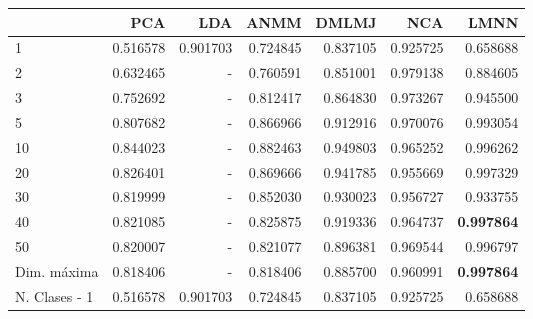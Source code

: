 \begin{tabular}{lrrrrrr}
\toprule
{} &       PCA &       LDA &      ANMM &     DMLMJ &       NCA &      LMNN \\
\midrule
1             &  0.516578 &  0.901703 &  0.724845 &  0.837105 &  0.925725 &  0.658688 \\
2             &  0.632465 &  -        &  0.760591 &  0.851001 &  0.979138 &  0.884605 \\
3             &  0.752692 &  -        &  0.812417 &  0.864830 &  0.973267 &  0.945500 \\
5             &  0.807682 &  -        &  0.866966 &  0.912916 &  0.970076 &  0.993054 \\
10            &  0.844023 &  -        &  0.882463 &  0.949803 &  0.965252 &  0.996262 \\
20            &  0.826401 &  -        &  0.869666 &  0.941785 &  0.955669 &  0.997329 \\
30            &  0.819999 &  -        &  0.852030 &  0.930023 &  0.956727 &  0.933755 \\
40            &  0.821085 &  -        &  0.825875 &  0.919336 &  0.964737 &  \textbf{0.997864} \\
50            &  0.820007 &  -        &  0.821077 &  0.896381 &  0.969544 &  0.996797 \\
Dim. máxima   &  0.818406 &  -        &  0.818406 &  0.885700 &  0.960991 &  \textbf{0.997864} \\
N. Clases - 1 &  0.516578 &  0.901703 &  0.724845 &  0.837105 &  0.925725 &  0.658688 \\
\bottomrule
\end{tabular}

